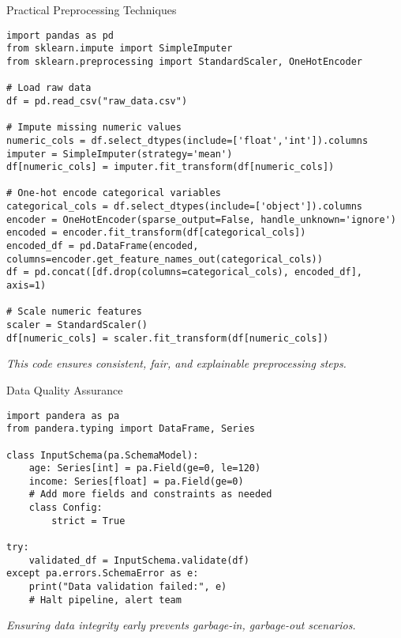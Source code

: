 \documentclass[aspectratio=169]{beamer}
\begin{document}
%
\begin{frame}{Practical Preprocessing Techniques}
\begin{verbatim}
import pandas as pd
from sklearn.impute import SimpleImputer
from sklearn.preprocessing import StandardScaler, OneHotEncoder

# Load raw data
df = pd.read_csv("raw_data.csv")

# Impute missing numeric values
numeric_cols = df.select_dtypes(include=['float','int']).columns
imputer = SimpleImputer(strategy='mean')
df[numeric_cols] = imputer.fit_transform(df[numeric_cols])

# One-hot encode categorical variables
categorical_cols = df.select_dtypes(include=['object']).columns
encoder = OneHotEncoder(sparse_output=False, handle_unknown='ignore')
encoded = encoder.fit_transform(df[categorical_cols])
encoded_df = pd.DataFrame(encoded, columns=encoder.get_feature_names_out(categorical_cols))
df = pd.concat([df.drop(columns=categorical_cols), encoded_df], axis=1)

# Scale numeric features
scaler = StandardScaler()
df[numeric_cols] = scaler.fit_transform(df[numeric_cols])
\end{verbatim}

\emph{This code ensures consistent, fair, and explainable preprocessing steps.}
\end{frame}

%
\begin{frame}{Data Quality Assurance}
\begin{verbatim}
import pandera as pa
from pandera.typing import DataFrame, Series

class InputSchema(pa.SchemaModel):
    age: Series[int] = pa.Field(ge=0, le=120)
    income: Series[float] = pa.Field(ge=0)
    # Add more fields and constraints as needed
    class Config:
        strict = True

try:
    validated_df = InputSchema.validate(df)
except pa.errors.SchemaError as e:
    print("Data validation failed:", e)
    # Halt pipeline, alert team
\end{verbatim}

\emph{Ensuring data integrity early prevents garbage-in, garbage-out scenarios.}
\end{frame}
\end{document}
